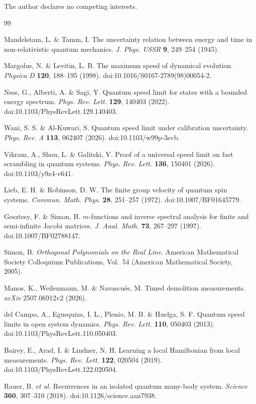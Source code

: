 \documentclass[10pt]{article}
\numberwithin{equation}{section}
\theoremstyle{definition}
\theoremstyle{remark}
\begin{document}
The author declares no competing interests.

\begin{thebibliography}{99}

Mandelstam, L. \& Tamm, I.
The uncertainty relation between energy and time in non-relativistic
quantum mechanics.
\emph{J. Phys. USSR} \textbf{9}, 249--254 (1945).

Margolus, N. \& Levitin, L. B.
The maximum speed of dynamical evolution.
\emph{Physica D} \textbf{120}, 188--195
(1998). doi:10.1016/S0167-2789(98)00054-2.

Ness, G., Alberti, A. \& Sagi, Y.
Quantum speed limit for states with a bounded energy spectrum.
\emph{Phys. Rev. Lett.} \textbf{129}, 140403
(2022). doi:10.1103/PhysRevLett.129.140403.

Wani, S. S. \& Al-Kuwari, S.
Quantum speed limit under calibration uncertainty.
\emph{Phys. Rev. A} \textbf{113}, 062407
(2026). doi:10.1103/w99p-3svb.

Vikram, A., Shou, L. \& Galitski, V.
Proof of a universal speed limit on fast scrambling in quantum systems.
\emph{Phys. Rev. Lett.} \textbf{136}, 150401
(2026). doi:10.1103/y9z4-v641.

Lieb, E. H. \& Robinson, D. W.
The finite group velocity of quantum spin systems.
\emph{Commun. Math. Phys.} \textbf{28}, 251--257
(1972). doi:10.1007/BF01645779.

Gesztesy, F. \& Simon, B.
\(m\)-functions and inverse spectral analysis for finite and semi-infinite
Jacobi matrices.
\emph{J. Anal. Math.} \textbf{73}, 267--297
(1997). doi:10.1007/BF02788147.

Simon, B.
\emph{Orthogonal Polynomials on the Real Line}.
American Mathematical Society Colloquium Publications, Vol.~54
(American Mathematical Society, 2005).

Manos, K., Weilenmann, M. \& Navascu\'es, M.
Timed demolition measurements.
\emph{arXiv} 2507.06912v2 (2026).

del Campo, A., Egusquiza, I. L., Plenio, M. B. \& Huelga, S. F.
Quantum speed limits in open system dynamics.
\emph{Phys. Rev. Lett.} \textbf{110}, 050403
(2013). doi:10.1103/PhysRevLett.110.050403.

Bairey, E., Arad, I. \& Lindner, N. H.
Learning a local Hamiltonian from local measurements.
\emph{Phys. Rev. Lett.} \textbf{122}, 020504
(2019). doi:10.1103/PhysRevLett.122.020504.

Rauer, B. \emph{et al.}
Recurrences in an isolated quantum many-body system.
\emph{Science} \textbf{360}, 307--310
(2018). doi:10.1126/science.aan7938.

\end{thebibliography}
\end{document}
